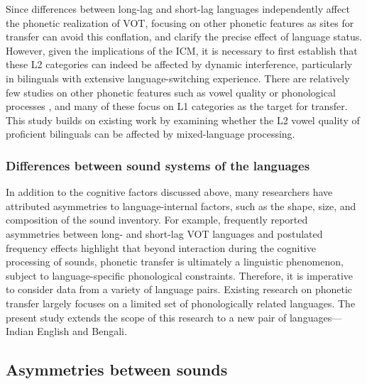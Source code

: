 \documentclass[12 pt]{article}
\begin{document}
Since differences between long-lag and short-lag languages independently affect the phonetic realization of VOT, focusing on other phonetic features as sites for transfer can avoid this conflation, and clarify the precise effect of language status. However, given the implications of the ICM, it is necessary to first establish that these L2 categories can indeed be affected by dynamic interference, particularly in bilinguals with extensive language-switching experience. There are relatively few studies on other phonetic features such as vowel quality \citep[see][]{simonet2014phonetic,muldner2019phonetics,elias2017effects} or phonological processes \citep[see][]{simonet2020increased,schwartz2015language}, and many of these focus on L1 categories as the target for transfer. %
This study builds on existing work by examining whether the L2 vowel quality of proficient bilinguals can be affected by mixed-language processing.

\subsubsection*{Differences between sound systems of the languages} \label{sound systems} In addition to the cognitive factors discussed above, many researchers have attributed asymmetries to language-internal factors, such as the shape, size, and composition of the sound inventory. For example, frequently reported asymmetries between long- and short-lag VOT languages \citep[see, e.g.,][]{tobin2017phonetic, olson2016role,bullock2009trying,antoniou2011inter,chang2012rapid} and postulated frequency effects \citep{antoniou2011inter} highlight that beyond interaction during the cognitive processing of sounds, phonetic transfer is ultimately a linguistic phenomenon, subject to language-specific phonological constraints. Therefore, it is imperative to consider data from a variety of language pairs. Existing research on phonetic transfer largely focuses on a limited set of phonologically related languages. The present study extends the scope of this research to a new pair of languages--- Indian English and Bengali.


\subsection{Asymmetries between sounds}\label{asymmetry between sounds}
\end{document}
